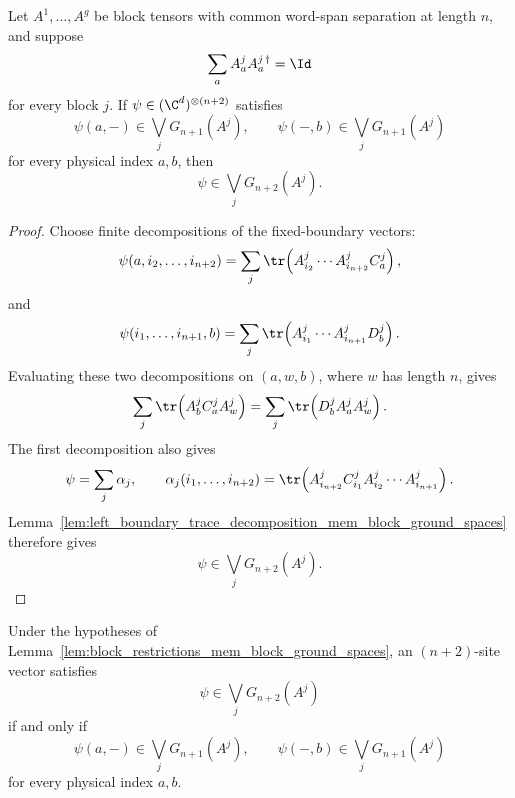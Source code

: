 \begin{lemma}
    \label{lem:block_restrictions_mem_block_ground_spaces}
    \leanok
    Let $A^1,\ldots,A^g$ be block tensors with common word-span separation at
    length $n$, and suppose
    \[
        \sum_a A^j_aA^{j\,\dagger}_a=\Id
    \]
    for every block $j$.  If $\psi\in(\C^d)^{\otimes(n+2)}$ satisfies
    \[
        \psi(a,-)\in\bigvee_jG_{n+1}(A^j),
        \qquad
        \psi(-,b)\in\bigvee_jG_{n+1}(A^j)
    \]
    for every physical index $a,b$, then
    \[
        \psi\in\bigvee_jG_{n+2}(A^j).
    \]
\end{lemma}

\begin{proof}
    \leanok
    Choose finite decompositions of the fixed-boundary vectors:
    \[
        \psi(a,i_2,\ldots,i_{n+2})
        =
        \sum_j
        \tr\!\left(
        A^j_{i_2}\cdots A^j_{i_{n+2}}C^j_a
        \right),
    \]
    and
    \[
        \psi(i_1,\ldots,i_{n+1},b)
        =
        \sum_j
        \tr\!\left(
        A^j_{i_1}\cdots A^j_{i_{n+1}}D^j_b
        \right).
    \]
    Evaluating these two decompositions on
    $(a,w,b)$, where $w$ has length $n$, gives
    \[
        \sum_j\tr\!\left(A^j_bC^j_aA^j_w\right)
        =
        \sum_j\tr\!\left(D^j_bA^j_aA^j_w\right).
    \]
    The first decomposition also gives
    \[
        \psi=\sum_j\alpha_j,\qquad
        \alpha_j(i_1,\ldots,i_{n+2})
        =
        \tr\!\left(
        A^j_{i_{n+2}}C^j_{i_1}
        A^j_{i_2}\cdots A^j_{i_{n+1}}
        \right).
    \]
    Lemma~\ref{lem:left_boundary_trace_decomposition_mem_block_ground_spaces}
    therefore gives
    \[
        \psi\in\bigvee_jG_{n+2}(A^j).
    \]
\end{proof}

\begin{lemma}
    \label{lem:block_restrictions_iff_block_ground_spaces}
    \leanok
    Under the hypotheses of
    Lemma~\ref{lem:block_restrictions_mem_block_ground_spaces}, an
    $(n+2)$-site vector satisfies
    \[
        \psi\in\bigvee_jG_{n+2}(A^j)
    \]
    if and only if
    \[
        \psi(a,-)\in\bigvee_jG_{n+1}(A^j),
        \qquad
        \psi(-,b)\in\bigvee_jG_{n+1}(A^j)
    \]
    for every physical index $a,b$.
\end{lemma}


